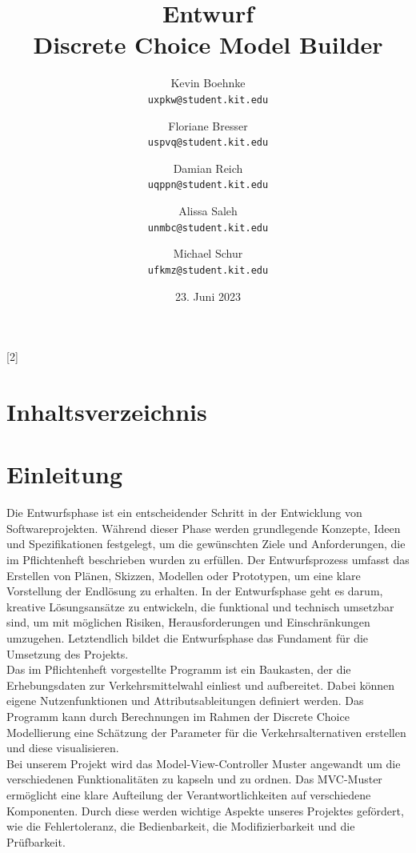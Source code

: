 \documentclass{article}
\title{Entwurf \\ \large Discrete Choice Model Builder}
\author{Kevin Boehnke \\ \texttt{uxpkw@student.kit.edu}
\and Floriane Bresser \\ \texttt{uspvq@student.kit.edu}
\and Damian Reich \\ \texttt{uqppn@student.kit.edu}
\and Alissa Saleh \\ \texttt{unmbc@student.kit.edu}
\and Michael Schur \\ \texttt{ufkmz@student.kit.edu}}
\date{23. Juni 2023}
\begin{document}
\maketitle
\newpage
\startcontents[maintableofcontents]
[2]{\section*{Inhaltsverzeichnis}}
\thispagestyle{empty}
\newpage
{}

\section{Einleitung}
Die Entwurfsphase ist ein entscheidender Schritt in der Entwicklung von Softwareprojekten. Während dieser Phase werden grundlegende Konzepte, Ideen und Spezifikationen festgelegt, um die gewünschten Ziele und Anforderungen, die im Pflichtenheft beschrieben wurden zu erfüllen. Der Entwurfsprozess umfasst das Erstellen von Plänen, Skizzen, Modellen oder Prototypen, um eine klare Vorstellung der Endlösung zu erhalten.
In der Entwurfsphase geht es darum, kreative Lösungsansätze zu entwickeln, die funktional und technisch umsetzbar sind, um mit möglichen Risiken, Herausforderungen und Einschränkungen umzugehen.
Letztendlich bildet die Entwurfsphase das Fundament für die Umsetzung des Projekts.\\

Das im Pflichtenheft vorgestellte Programm ist ein Baukasten, der die Erhebungsdaten zur Verkehrsmittelwahl einliest und aufbereitet. Dabei können eigene Nutzenfunktionen und Attributsableitungen definiert werden. Das Programm kann durch Berechnungen im Rahmen der Discrete Choice Modellierung eine Schätzung der Parameter für die Verkehrsalternativen erstellen und diese visualisieren.\\

Bei unserem Projekt wird das Model-View-Controller Muster angewandt um die verschiedenen Funktionalitäten zu kapseln und zu ordnen.
Das MVC-Muster ermöglicht eine klare Aufteilung der Verantwortlichkeiten auf verschiedene Komponenten.
Durch diese werden wichtige Aspekte unseres Projektes gefördert, wie die Fehlertoleranz, die Bedienbarkeit, die Modifizierbarkeit und die Prüfbarkeit.
\end{document}
